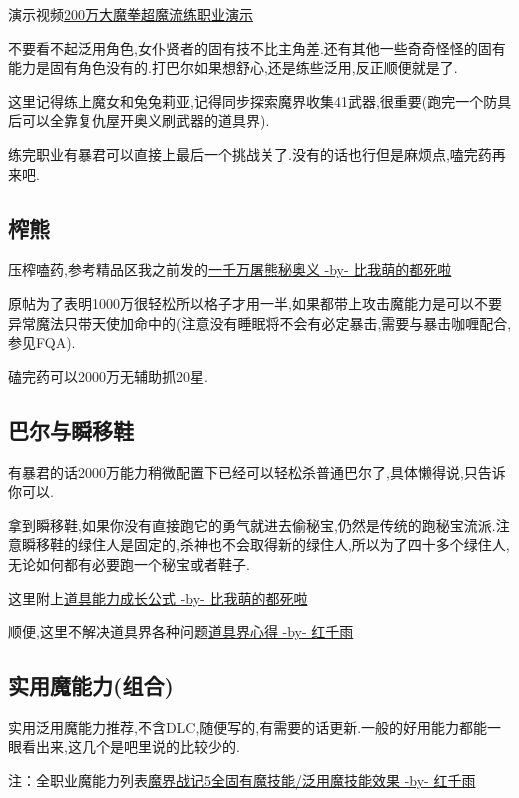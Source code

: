 		演示视频\href{http://www.bilibili.com/video/av2966618/}{200万大魔拳超魔流练职业演示}

		不要看不起泛用角色,女仆贤者的固有技不比主角差.还有其他一些奇奇怪怪的固有能力是固有角色没有的.打巴尔如果想舒心,还是练些泛用,反正顺便就是了.

		这里记得练上魔女和兔兔莉亚,记得同步探索魔界收集41武器,很重要(跑完一个防具后可以全靠复仇屋开奥义刷武器的道具界).

		练完职业有暴君可以直接上最后一个挑战关了.没有的话也行但是麻烦点,嗑完药再来吧.

	\subsection{榨熊}

	压榨嗑药,参考精品区我之前发的\href{http://tieba.baidu.com/p/3825275063}{一千万屠熊秘奥义 -by- 比我萌的都死啦}

	原帖为了表明1000万很轻松所以格子才用一半,如果都带上攻击魔能力是可以不要异常魔法只带天使加命中的(注意没有睡眠将不会有必定暴击,需要与暴击咖喱配合,参见FQA).

	磕完药可以2000万无辅助抓20星.
		

	\subsection{巴尔与瞬移鞋}

	有暴君的话2000万能力稍微配置下已经可以轻松杀普通巴尔了,具体懒得说,只告诉你可以.

	拿到瞬移鞋,如果你没有直接跑它的勇气就进去偷秘宝,仍然是传统的跑秘宝流派.注意瞬移鞋的绿住人是固定的,杀神也不会取得新的绿住人,所以为了四十多个绿住人,无论如何都有必要跑一个秘宝或者鞋子.

	这里附上\href{http://tieba.baidu.com/f?kz=3834692385}{道具能力成长公式 -by- 比我萌的都死啦}

	顺便,这里不解决道具界各种问题\href{http://tieba.baidu.com/p/3730196003}{道具界心得 -by- 红千雨}

	\subsection{实用魔能力(组合)}

	实用泛用魔能力推荐,不含DLC,随便写的,有需要的话更新.一般的好用能力都能一眼看出来,这几个是吧里说的比较少的.

	注：全职业魔能力列表\href{http://tieba.baidu.com/p/3765501530}{魔界战记5全固有魔技能/泛用魔技能效果 -by- 红千雨}

